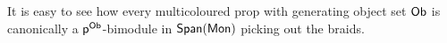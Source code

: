 %
%
%
%
%
%
%
%

It is easy to see how every multicoloured prop with generating object set $\sf Ob$ is canonically a $\P^{\sf Ob}$-bimodule in $\Span(\Mon)$ picking out the braids.


